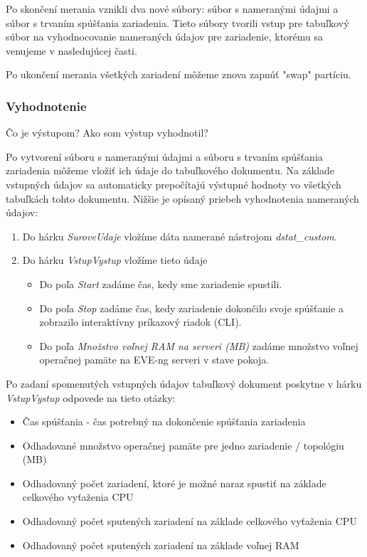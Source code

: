 Po skončení merania vznikli dva nové súbory: súbor s nameranými údajmi a súbor s trvaním spúšťania zariadenia. Tieto súbory tvorili vstup pre tabuľkový súbor na vyhodnocovanie nameraných údajov pre zariadenie, ktorému sa venujeme v nasledujúcej časti.

Po ukončení merania všetkých zariadení môžeme znova zapnúť "swap" partíciu.




\subsubsection{Vyhodnotenie}
\label{chap:testovanie_zariadeni_benchmark_vyhodnotenie}

Čo je výstupom?
Ako som výstup vyhodnotil?


Po vytvorení súboru s nameranými údajmi a súboru s trvaním spúšťania zariadenia môžeme vložiť ich údaje do tabuľkového dokumentu. Na základe vstupných údajov sa automaticky prepočítajú výstupné hodnoty vo všetkých tabuľkách tohto dokumentu. Nižšie je opísaný priebeh vyhodnotenia nameraných údajov:

\begin{enumerate}
    \item Do hárku \emph{SuroveUdaje} vložíme dáta namerané nástrojom \emph{dstat\_custom}.
    \item Do hárku \emph{VstupVystup} vložíme tieto údaje
    \begin{itemize}
        \item Do poľa \emph{Start} zadáme čas, kedy sme zariadenie spustili.
        \item Do poľa \emph{Stop} zadáme čas, kedy zariadenie dokončilo svoje spúšťanie a zobrazilo interaktívny príkazový riadok (CLI).
        \item Do poľa \emph{Množstvo voľnej RAM na serveri (MB)} zadáme množstvo voľnej operačnej pamäte na EVE-ng serveri v stave pokoja.
    \end{itemize}
\end{enumerate}

Po zadaní spomenutých vstupných údajov tabuľkový dokument poskytne v hárku \emph{VstupVystup} odpovede na tieto otázky:

\begin{itemize}
    \item Čas spúšťania - čas potrebný na dokončenie spúšťania zariadenia
    \item Odhadované množstvo operačnej pamäte pre jedno zariadenie / topológiu (MB)
    \item Odhadovaný počet zariadení, ktoré je možné naraz spustiť na základe celkového vyťaženia CPU
    \item Odhadovaný počet sputených zariadení na základe celkového vyťaženia CPU
    \item Odhadovaný počet sputených zariadení na základe voľnej RAM
\end{itemize}


